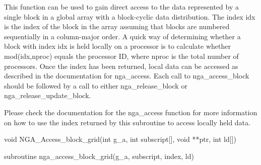 \documentclass[12pt]{article}
\begin{document}
\begin{fdesc}
This function can be used to gain direct access to the data represented by a
single block in a global array with a block-cyclic data distribution.  The
index idx is the index of the block in the array assuming that blocks are
numbered sequentially in a column-major order. A quick way of determining
whether a block with index idx is held locally on a processor is to calculate
whether mod(idx,nproc) equals the processor ID, where nproc is the total number
of processors. Once the index has been returned, local data can be accessed as
described in the documentation for nga_access. Each call to nga_access_block
should be followed by a call to either nga_release_block or
nga_release_update_block.

Please check the documentation for the nga_access function for more information on
how to use the index returned by this subroutine to access locally held data.
\end{fdesc}



\begin{capi}
\begin{ccode}
void NGA_Access_block_grid(int g_a, int subscript[], void **ptr, int ld[])
\end{ccode}
\begin{funcargs}
\end{funcargs}
\end{capi}

\begin{fapi}
\begin{fcode}
subroutine nga_access_block_grid(g_a, subscript, index, ld)
\end{fcode}
\begin{funcargs}
\end{funcargs}
\end{fapi}
\end{document}
